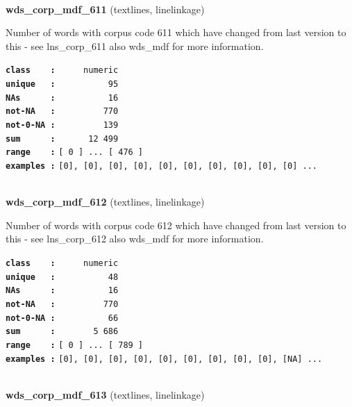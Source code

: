 \documentclass[]{article}
\begin{document}
~

\textbf{wds\_corp\_mdf\_611} (textlines, linelinkage)

Number of words with corpus code 611 which have changed from last
version to this - see lns\_corp\_611 also wds\_mdf for more information.

\textbf{\texttt{class\ \ \ \ :}} \texttt{~~~~~numeric}\\
\textbf{\texttt{unique\ \ \ :}} \texttt{~~~~~~~~~~95}\\
\textbf{\texttt{NAs\ \ \ \ \ \ :}} \texttt{~~~~~~~~~~16}\\
\textbf{\texttt{not-NA\ \ \ :}} \texttt{~~~~~~~~~770}\\
\textbf{\texttt{not-0-NA\ :}} \texttt{~~~~~~~~~139}\\
\textbf{\texttt{sum\ \ \ \ \ \ :}} \texttt{~~~~~~12~499}\\
\textbf{\texttt{range\ \ \ \ :}}
\texttt{{[}\ 0\ {]}\ ...\ {[}\ 476\ {]}}\\
\textbf{\texttt{examples\ :}}
\texttt{{[}0{]},\ {[}0{]},\ {[}0{]},\ {[}0{]},\ {[}0{]},\ {[}0{]},\ {[}0{]},\ {[}0{]},\ {[}0{]},\ {[}0{]}\ ...}\\

~

\textbf{wds\_corp\_mdf\_612} (textlines, linelinkage)

Number of words with corpus code 612 which have changed from last
version to this - see lns\_corp\_612 also wds\_mdf for more information.

\textbf{\texttt{class\ \ \ \ :}} \texttt{~~~~~numeric}\\
\textbf{\texttt{unique\ \ \ :}} \texttt{~~~~~~~~~~48}\\
\textbf{\texttt{NAs\ \ \ \ \ \ :}} \texttt{~~~~~~~~~~16}\\
\textbf{\texttt{not-NA\ \ \ :}} \texttt{~~~~~~~~~770}\\
\textbf{\texttt{not-0-NA\ :}} \texttt{~~~~~~~~~~66}\\
\textbf{\texttt{sum\ \ \ \ \ \ :}} \texttt{~~~~~~~5~686}\\
\textbf{\texttt{range\ \ \ \ :}}
\texttt{{[}\ 0\ {]}\ ...\ {[}\ 789\ {]}}\\
\textbf{\texttt{examples\ :}}
\texttt{{[}0{]},\ {[}0{]},\ {[}0{]},\ {[}0{]},\ {[}0{]},\ {[}0{]},\ {[}0{]},\ {[}0{]},\ {[}0{]},\ {[}NA{]}\ ...}\\

~

\textbf{wds\_corp\_mdf\_613} (textlines, linelinkage)
\end{document}
